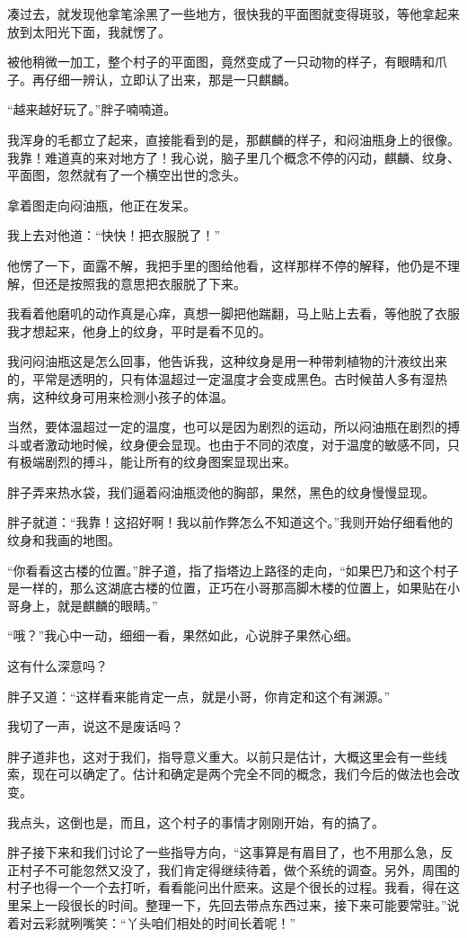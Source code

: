 凑过去，就发现他拿笔涂黑了一些地方，很快我的平面图就变得斑驳，等他拿起来放到太阳光下面，我就愣了。

被他稍微一加工，整个村子的平面图，竟然变成了一只动物的样子，有眼睛和爪子。再仔细一辨认，立即认了出来，那是一只麒麟。

“越来越好玩了。”胖子喃喃道。

我浑身的毛都立了起来，直接能看到的是，那麒麟的样子，和闷油瓶身上的很像。我靠！难道真的来对地方了！我心说，脑子里几个概念不停的闪动，麒麟、纹身、平面图，忽然就有了一个横空出世的念头。

拿着图走向闷油瓶，他正在发呆。

我上去对他道：“快快！把衣服脱了！”

他愣了一下，面露不解，我把手里的图给他看，这样那样不停的解释，他仍是不理解，但还是按照我的意思把衣服脱了下来。

我看着他磨叽的动作真是心痒，真想一脚把他踹翻，马上贴上去看，等他脱了衣服我才想起来，他身上的纹身，平时是看不见的。

我问闷油瓶这是怎么回事，他告诉我，这种纹身是用一种带刺植物的汁液纹出来的，平常是透明的，只有体温超过一定温度才会变成黑色。古时候苗人多有湿热病，这种纹身可用来检测小孩子的体温。

当然，要体温超过一定的温度，也可以是因为剧烈的运动，所以闷油瓶在剧烈的搏斗或者激动地时候，纹身便会显现。也由于不同的浓度，对于温度的敏感不同，只有极端剧烈的搏斗，能让所有的纹身图案显现出来。

胖子弄来热水袋，我们逼着闷油瓶烫他的胸部，果然，黑色的纹身慢慢显现。

胖子就道：“我靠！这招好啊！我以前作弊怎么不知道这个。”我则开始仔细看他的纹身和我画的地图。

“你看看这古楼的位置。”胖子道，指了指塔边上路径的走向，“如果巴乃和这个村子是一样的，那么这湖底古楼的位置，正巧在小哥那高脚木楼的位置上，如果贴在小哥身上，就是麒麟的眼睛。”

“哦？”我心中一动，细细一看，果然如此，心说胖子果然心细。

这有什么深意吗？

胖子又道：“这样看来能肯定一点，就是小哥，你肯定和这个有渊源。”

我切了一声，说这不是废话吗？

胖子道非也，这对于我们，指导意义重大。以前只是估计，大概这里会有一些线索，现在可以确定了。估计和确定是两个完全不同的概念，我们今后的做法也会改变。

我点头，这倒也是，而且，这个村子的事情才刚刚开始，有的搞了。

胖子接下来和我们讨论了一些指导方向，“这事算是有眉目了，也不用那么急，反正村子不可能忽然又没了，我们肯定得继续待着，做个系统的调查。另外，周围的村子也得一个一个去打听，看看能问出什麽来。这是个很长的过程。我看，得在这里呆上一段很长的时间。整理一下，先回去带点东西过来，接下来可能要常驻。”说着对云彩就咧嘴笑：“丫头咱们相处的时间长着呢！”

